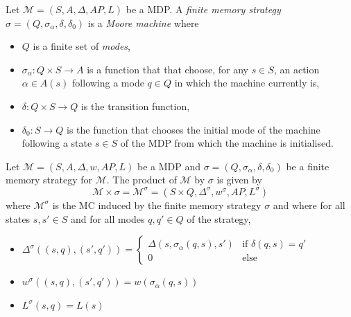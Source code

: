 \begin{definition}
Let $\mathcal{M} = (S, A, \Delta, AP, L)$ be a MDP.
A \textit{finite memory strategy} $\sigma = (Q, \sigma_\alpha, \delta, \delta_0)$ is a \textit{Moore machine} where
\begin{itemize}
	\item $Q$ is a finite set of \textit{modes},
	\item $\sigma_\alpha : Q \times S \rightarrow A$ is a function that that choose, for any $s \in S$, an action $\alpha \in A(s)$ following a mode $q \in Q$ in which the machine currently is,
	\item $\delta: Q \times S \rightarrow Q$ is the transition function,
	\item $\delta_0 : S \rightarrow Q$ is the function that chooses the initial mode of the machine following a state $s \in S$ of the MDP from which the machine is initialised.
\end{itemize}
\end{definition}

\begin{definition}
Let $\mathcal{M} = (S, A, \Delta, w, AP, L)$ be a MDP and $\sigma = (Q, \sigma_\alpha, \delta, \delta_0)$ be a finite memory strategy for $\mathcal{M}$.
The product of $\mathcal{M}$ by $\sigma$ is given by
\[ \mathcal{M} \times \sigma = \mathcal{M}^\sigma = (S \times Q, \Delta^\sigma, w^\sigma, AP, L^\sigma) \]
where $\mathcal{M}^\sigma$ is the MC induced by the finite memory strategy $\sigma$ and where
for all states $s, s' \in S$ and for all modes $q, q' \in Q$ of the strategy,
\begin{itemize}
	\item $\Delta^\sigma((s, q), (s', q')) =
	\begin{cases}
	\Delta(s, \sigma_\alpha(q, s), s') & \text{if } \delta(q, s) = q'\\
	0  & \text{else}
	\end{cases}$
  \item $w^\sigma((s, q), (s', q')) = w(\sigma_\alpha(q, s))$
  \item $L^\sigma(s, q) = L(s)$
\end{itemize}
\end{definition}

